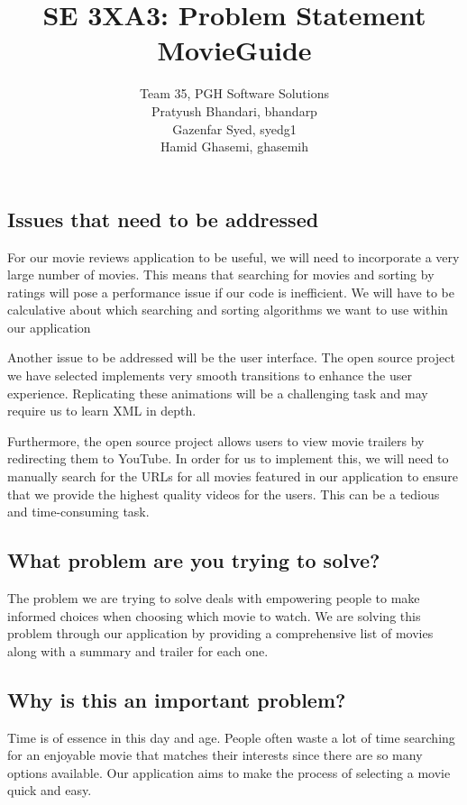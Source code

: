 \documentclass[12pt]{article}
\title{\vspace{-2.5cm}SE 3XA3: Problem Statement\\MovieGuide}
\author{Team 35, PGH Software Solutions
		\\ Pratyush Bhandari, bhandarp
		\\ Gazenfar Syed, syedg1
		\\ Hamid Ghasemi, ghasemih
}
\date{}
\begin{document}
\newpage

\maketitle

\subsection*{Issues that need to be addressed}
\indent

For our movie reviews application to be useful, we will need to incorporate a very large number of movies. This means that searching for movies and sorting by ratings will pose a performance issue if our code is inefficient. We will have to be calculative about which searching and sorting algorithms we want to use within our application
	
Another issue to be addressed will be the user interface. The open source project we have selected implements very smooth transitions to enhance the user experience. Replicating these animations will be a challenging task and may require us to learn XML in depth.
	
Furthermore, the open source project allows users to view movie trailers by redirecting them to YouTube. In order for us to implement this, we will need to manually search for the URLs for all movies featured in our application to ensure that we provide the highest quality videos for the users. This can be a tedious and time-consuming task. 

\subsection*{What problem are you trying to solve?}
\indent

The problem we are trying to solve deals with empowering people to make informed choices when choosing which movie to watch. We are solving this problem through our application by providing a comprehensive list of movies along with a summary and trailer for each one.

\subsection*{Why is this an important problem?}
\indent

Time is of essence in this day and age. People often waste a lot of time searching for an enjoyable movie that matches their interests since there are so many options available. Our application aims to make the process of selecting a movie quick and easy.
\end{document}
